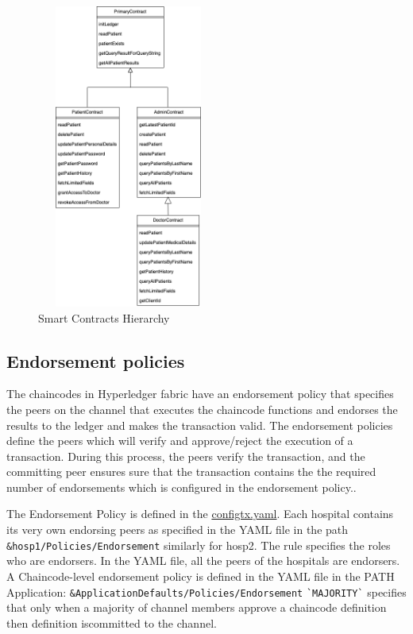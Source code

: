 \begin{figure}[htbp]
 \centering
 \includegraphics[width=6cm, height=10cm]{gfx/figures/smartContractHierarchy.png}
 \caption{Smart Contracts Hierarchy}
 \label{fig:chapter03:smartContractHierarchy}
\end{figure}

\subsection{Endorsement policies}
The chaincodes in Hyperledger fabric have an endorsement policy that specifies the peers on the channel that executes the chaincode functions and endorses the results to the ledger and makes the transaction valid. The endorsement policies define the peers which will verify and approve/reject the execution of a transaction. During this process, the peers verify the transaction, and the committing peer ensures sure that the transaction contains the the required number of endorsements which is configured in the endorsement policy.\cite{Policies}.

The Endorsement Policy is defined in the \href{https://github.com/kshitijyelpale/blockchain-hyperledger-fabric-electronic-patient-records/blob/main/app/first-network/configtx/configtx.yaml}{configtx.yaml}. Each hospital contains its very own endorsing peers as specified in the YAML file in the path \lstinline{&hosp1/Policies/Endorsement} similarly for hosp2. The rule specifies the roles who are endorsers. In the YAML file, all the peers of the hospitals are endorsers. A Chaincode-level endorsement policy is defined in the YAML file in the PATH Application: \lstinline{&ApplicationDefaults/Policies/Endorsement} \lstinline{`MAJORITY`} specifies that only when a majority of channel members approve a chaincode definition then definition iscommitted to the channel.

